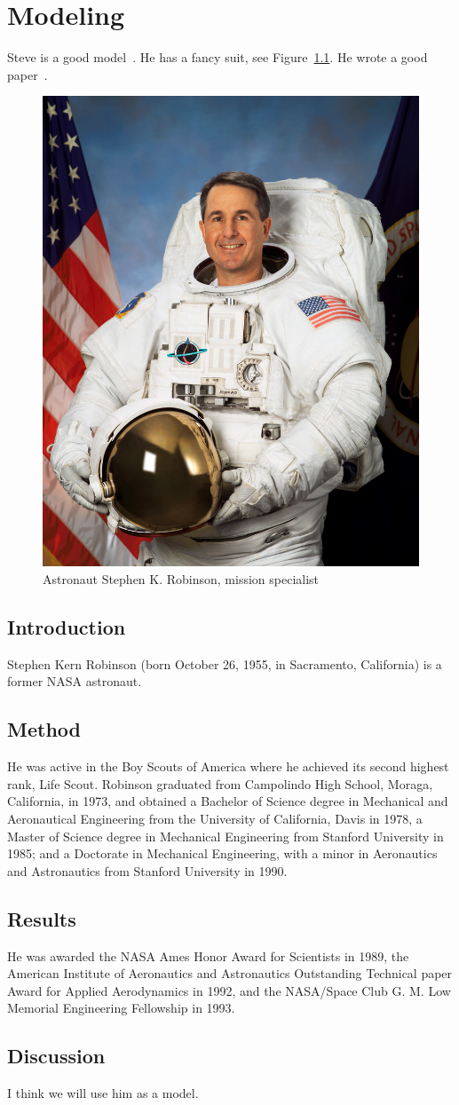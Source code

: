 \chapter{Modeling}
Steve is a good model~\citep{stevewiki}.
He has a fancy suit, see Figure~\ref{figure:fancysuit}.
He wrote a good paper~\citep{robinson1991coherent}.

\begin{figure}[tb]
    \begin{center}
        \includegraphics[width=0.25\linewidth]{figures/Modeling/Stephen_Robinson_NASA_STS114.jpg}
        \caption[Fancy suit man]{Astronaut Stephen K. Robinson, mission specialist}
        \label{figure:fancysuit}
    \end{center}
\end{figure}

\section{Introduction}
Stephen Kern Robinson (born October 26, 1955, in Sacramento, California) is a former NASA astronaut.

\section{Method}
He was active in the Boy Scouts of America where he achieved its second highest rank, Life Scout.
Robinson graduated from Campolindo High School, Moraga, California, in 1973, and obtained a Bachelor of Science degree in Mechanical and Aeronautical Engineering from the University of California, Davis in 1978, a Master of Science degree in Mechanical Engineering from Stanford University in 1985; and a Doctorate in Mechanical Engineering, with a minor in Aeronautics and Astronautics from Stanford University in 1990.

\section{Results}
He was awarded the NASA Ames Honor Award for Scientists in 1989, the American Institute of Aeronautics and Astronautics Outstanding Technical paper Award for Applied Aerodynamics in 1992, and the NASA/Space Club G. M. Low Memorial Engineering Fellowship in 1993.

\section{Discussion}
I think we will use him as a model.
